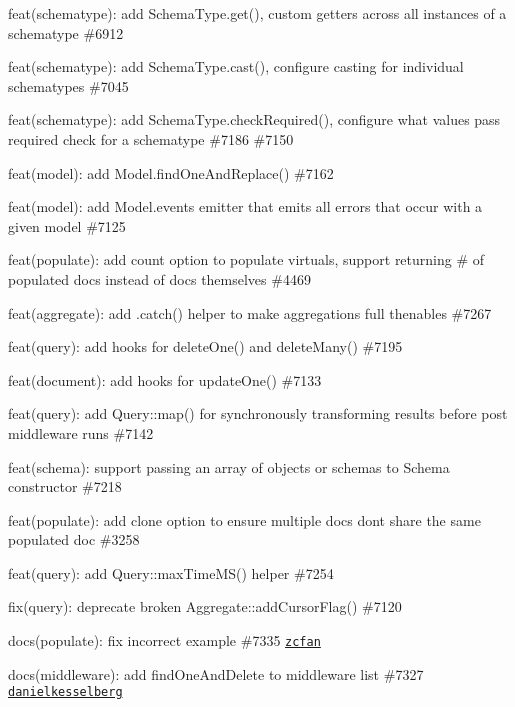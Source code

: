 
\begin{DoxyItemize}
\item feat(schematype)\+: add {\ttfamily Schema\+Type.\+get()}, custom getters across all instances of a schematype \#6912
\item feat(schematype)\+: add {\ttfamily Schema\+Type.\+cast()}, configure casting for individual schematypes \#7045
\item feat(schematype)\+: add {\ttfamily Schema\+Type.\+check\+Required()}, configure what values pass {\ttfamily required} check for a schematype \#7186 \#7150
\item feat(model)\+: add {\ttfamily Model.\+find\+One\+And\+Replace()} \#7162
\item feat(model)\+: add {\ttfamily Model.\+events} emitter that emits all {\ttfamily error}\textquotesingle{}s that occur with a given model \#7125
\item feat(populate)\+: add {\ttfamily count} option to populate virtuals, support returning \# of populated docs instead of docs themselves \#4469
\item feat(aggregate)\+: add {\ttfamily .catch()} helper to make aggregations full thenables \#7267
\item feat(query)\+: add hooks for {\ttfamily delete\+One()} and {\ttfamily delete\+Many()} \#7195
\item feat(document)\+: add hooks for {\ttfamily update\+One()} \#7133
\item feat(query)\+: add {\ttfamily Query\+::map()} for synchronously transforming results before post middleware runs \#7142
\item feat(schema)\+: support passing an array of objects or schemas to {\ttfamily Schema} constructor \#7218
\item feat(populate)\+: add {\ttfamily clone} option to ensure multiple docs don\textquotesingle{}t share the same populated doc \#3258
\item feat(query)\+: add {\ttfamily Query\+::max\+Time\+M\+S()} helper \#7254
\item fix(query)\+: deprecate broken {\ttfamily Aggregate\+::add\+Cursor\+Flag()} \#7120
\item docs(populate)\+: fix incorrect example \#7335 \href{https://github.com/zcfan}{\tt zcfan}
\item docs(middleware)\+: add {\ttfamily find\+One\+And\+Delete} to middleware list \#7327 \href{https://github.com/danielkesselberg}{\tt danielkesselberg}
\end{DoxyItemize}

